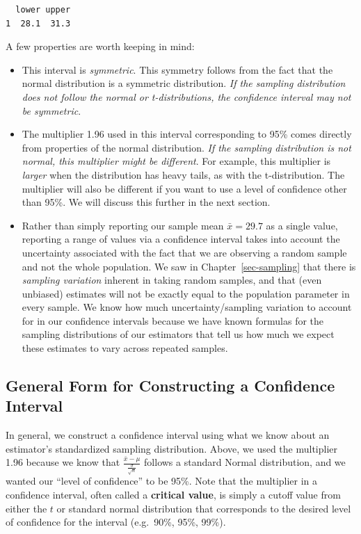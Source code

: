 \documentclass[
  letterpaper,
  DIV=11,
  numbers=noendperiod]{scrreprt}
\providecommand{\tightlist}{%
  \setlength{\itemsep}{0pt}\setlength{\parskip}{0pt}}\usepackage{longtable,booktabs,array}
\theoremstyle{definition}
\theoremstyle{remark}
\begin{document}
\begin{verbatim}
  lower upper
1  28.1  31.3
\end{verbatim}

A few properties are worth keeping in mind:

\begin{itemize}
\tightlist
\item
  This interval is \emph{symmetric}. This symmetry follows from the fact
  that the normal distribution is a symmetric distribution. \emph{If the
  sampling distribution does not follow the normal or t-distributions,
  the confidence interval may not be symmetric}.
\item
  The multiplier 1.96 used in this interval corresponding to 95\% comes
  directly from properties of the normal distribution. \emph{If the
  sampling distribution is not normal, this multiplier might be
  different}. For example, this multiplier is \emph{larger} when the
  distribution has heavy tails, as with the t-distribution. The
  multiplier will also be different if you want to use a level of
  confidence other than 95\%. We will discuss this further in the next
  section.
\item
  Rather than simply reporting our sample mean \(\bar{x} = 29.7\) as a
  single value, reporting a range of values via a confidence interval
  takes into account the uncertainty associated with the fact that we
  are observing a random sample and not the whole population. We saw in
  Chapter~\ref{sec-sampling} that there is \emph{sampling variation}
  inherent in taking random samples, and that (even unbiased) estimates
  will not be exactly equal to the population parameter in every sample.
  We know how much uncertainty/sampling variation to account for in our
  confidence intervals because we have known formulas for the sampling
  distributions of our estimators that tell us how much we expect these
  estimates to vary across repeated samples.
\end{itemize}

\hypertarget{general-form-for-constructing-a-confidence-interval}{%
\subsection{General Form for Constructing a Confidence
Interval}\label{general-form-for-constructing-a-confidence-interval}}

In general, we construct a confidence interval using what we know about
an estimator's standardized sampling distribution. Above, we used the
multiplier 1.96 because we know that
\(\frac{\bar{x} - \mu}{\frac{\sigma}{\sqrt{n}}}\) follows a standard
Normal distribution, and we wanted our ``level of confidence'' to be
95\%. Note that the multiplier in a confidence interval, often called a
\textbf{critical value}, is simply a cutoff value from either the \(t\)
or standard normal distribution that corresponds to the desired level of
confidence for the interval (e.g.~90\%, 95\%, 99\%).
\end{document}
